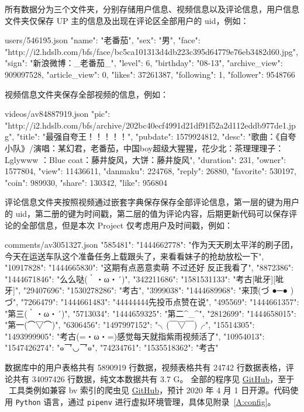 所有数据分为三个文件夹，分别存储用户信息、视频信息以及评论信息，用户信息文件夹仅保存 UP 主的信息及出现在评论区全部用户的 uid，例如：
\begin{python}{users/546195.json}
{"name": "老番茄", "sex": "男", "face": "http://i2.hdslb.com/bfs/face/bc5ca101313d4db223c395d64779e76eb3482d60.jpg", "sign": "新浪微博：_老番茄_", "level": 6, "birthday": "08-13", "archive_view": 909097528, "article_view": 0, "likes": 37261387, "following": 1, "follower": 9548766}
\end{python}
视频信息文件夹保存全部视频的信息，例如：
\begin{python}{videos/av84887919.json}
{"pic": "http://i2.hdslb.com/bfs/archive/202bc40ecf4991d21df91f52a2d112eddb977de1.jpg", "title": "最强自夸王！！！！！", "pubdate": 1579924812, "desc": "歌曲：《自夸小队》/演唱：某幻君，老番茄，中国boy超级大猩猩，花少北\nHOOK：茶理理理子：Lglywww ：Blue coat：藤井旋风，大饼：藤井旋风", "duration": 231, "owner": 1577804, "view": 11436611, "danmaku": 224768, "reply": 26880, "favorite": 530197, "coin": 989930, "share": 130342, "like": 956804}
\end{python}
评论信息文件夹按照视频通过嵌套字典保存保存全部评论信息，第一层的键为用户的 uid，第二册的键为时间戳，第二层的值为评论内容，后期更新代码可以保存评论的全部信息，但是本次 Project 仅考虑用户及时间戳，例如：
\begin{python}{comments/av3051327.json}
{"585481": {"1444662778": "作为天天刷太平洋的刷子团，今天在运送车队这个准备任务上载跟头了，来看看妹子的抢劫放松一下"}, "10917828": {"1444665830": "这期有点恶意卖萌    不过还好  反正我看了"}, "8872386": {"1444671846": "么么哒(｀・ω・´)"}, "342211686": {"1581531133": "考古[呲牙][呲牙]"}, "29407696": {"1530278286": "考古"}, "3999038": {"1444689968": "来顶(づ ●─● )づ"}, "7266479": {"1444661483": "44444444先投币点赞在说"}, "495569": {"1444661357": "第三(｀・ω・´)"}, "5713034": {"1444659325": "第二^_^"}, "2812699": {"1444658015": "第一(⌒▽⌒)"}, "6306456": {"1497997152": "╮(￣▽￣)╭"}, "15514305": {"1493999905": "考古(=・ω・=)感觉每天就指紫雨视频活了"}, "10954013": {"1547426274": "๑乛◡乛๑"}, "74234761": {"1535518362": "考古"}}
\end{python}

数据库中的用户表格共有 5890919 行数据，视频表格共有 24742 行数据表格，评论共有 34097426 行数据，纯文本数据共有 3.7 G。
全部的程序见 \href{https://github.com/Iydon/homework/tree/master/CS307}{GitHub}，至于 \bilibili\ 工具类例如兼容 bv 索引的爬虫见 \href{https://github.com/iydon/bilibili}{GitHub}，预计 2020 年 4 月 1 日开源。代码使用 \texttt{Python} 语言，通过 \texttt{pipenv} 进行虚拟环境管理，具体见附录~\ref{A:config}。


